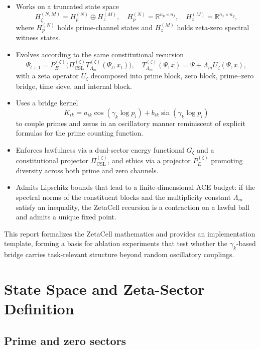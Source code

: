 \documentclass[11pt]{article}
\theoremstyle{definition}
\theoremstyle{plain}
\begin{document}
\begin{itemize}[leftmargin=*]
  \item Works on a truncated state space
  \[
    H_\zeta^{(N,M)} = H_p^{(N)} \oplus H_z^{(M)},
    \quad
    H_p^{(N)} = \mathbb{R}^{n_p \times n_f},
    \quad
    H_z^{(M)} = \mathbb{R}^{n_z \times n_g},
  \]
  where $H_p^{(N)}$ holds prime-channel states and $H_z^{(M)}$ holds zeta-zero spectral witness states.

  \item Evolves according to the same constitutional recursion
  \[
    \Psi_{t+1} = P_E^{(\zeta)}\!\bigl(\Pi_{\mathrm{CSL}}^{(\zeta)} T_{\Lambda_m}^{(\zeta)}(\Psi_t,x_t)\bigr),
    \quad
    T_{\Lambda_m}^{(\zeta)}(\Psi,x) = \Psi + \Lambda_m U_\zeta(\Psi,x),
  \]
  with a zeta operator $U_\zeta$ decomposed into prime block, zero block, prime--zero bridge, time sieve, and internal block.

  \item Uses a bridge kernel
  \[
    K_{ik} = a_{ik}\cos(\gamma_k \log p_i) + b_{ik}\sin(\gamma_k \log p_i)
  \]
  to couple primes and zeros in an oscillatory manner reminiscent of explicit formulas for the prime counting function.

  \item Enforces lawfulness via a dual-sector energy functional $G_\zeta$ and a constitutional projector $\Pi_{\mathrm{CSL}}^{(\zeta)}$, and ethics via a projector $P_E^{(\zeta)}$ promoting diversity across both prime and zero channels.

  \item Admits Lipschitz bounds that lead to a finite-dimensional ACE budget: if the spectral norms of the constituent blocks and the multiplicity constant $\Lambda_m$ satisfy an inequality, the ZetaCell recursion is a contraction on a lawful ball and admits a unique fixed point.

\end{itemize}

This report formalizes the ZetaCell mathematics and provides an implementation template, forming a basis for ablation experiments that test whether the $\gamma_k$-based bridge carries task-relevant structure beyond random oscillatory couplings.

\section{State Space and Zeta-Sector Definition}

\subsection{Prime and zero sectors}
\end{document}
